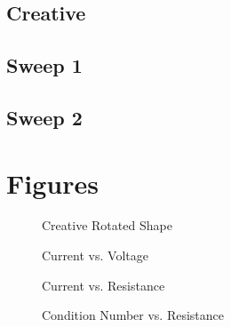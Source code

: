\documentclass{article}
\begin{document}
\subsection{Creative}

\subsection{Sweep 1}

\subsection{Sweep 2}

\pagebreak
\section{Figures}

\begin{figure}[htb!]
\begin{center}
\caption{Creative Rotated Shape}
\end{center}
\end{figure}

\begin{figure}[htb!]
\begin{center}
\caption{Current vs. Voltage}
\end{center}
\end{figure}

\begin{figure}[htb!]
\begin{center}
\caption{Current vs. Resistance}
\end{center}
\end{figure}

\begin{figure}[htb!]
\begin{center}
\caption{Condition Number vs. Resistance}
\end{center}
\end{figure}
\end{document}
